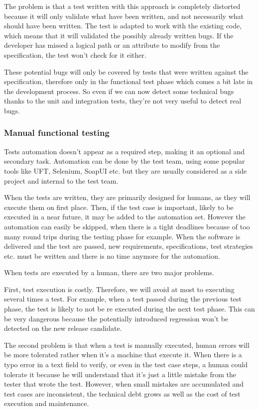 The problem is that a test written with this approach is completely distorted
because it will only validate what have been written, and not necessarily
what should have been written.
The test is adapted to work with the existing code, which means that it will
validated the possibly already written bugs.
If the developer has missed a logical path or an attribute to modify from the
specification, the test won't check for it either.

These potential bugs will only be covered by tests that were written against the
specification, therefore only in the functional test phase which comes a bit
late in the development process.
So even if we can now detect some technical bugs thanks to the unit and
integration tests, they're not very useful to detect real bugs.

\subsubsection{Manual functional testing}
Tests automation doesn't appear as a required step, making it an
optional and secondary task.
Automation can be done by the test team, using some popular tools like UFT,
Selenium, SoapUI etc.
but they are usually considered as a side project and internal to the test team.

When the tests are written, they are primarily designed for humans, as they
will execute them on first place.
Then, if the test case is important, likely to be executed in a near future,
it may be added to the automation set.
However the automation can easily be skipped, when there is a tight
deadlines because of too many round trips during the testing phase for example.
When the software is delivered and the test are passed, new
requirements, specifications, test strategies etc.
must be written and there is no time anymore for the automation.

When tests are executed by a human, there are two major problems.

First, test execution is costly.
Therefore, we will avoid at most to executing several times a test.
For example, when a test passed during the previous test phase, the test
is likely to not be re executed during the next test phase.
This can be very dangerous because the potentially introduced regression
won't be detected on the new release candidate.

The second problem is that when a test is manually executed, human errors
will be more tolerated rather when it's a machine that execute it.
When there is a typo error in a text field to verify, or even in the test case
steps, a human could tolerate it because he will understand that it's just a
little mistake from the tester that wrote the test.
However, when small mistakes are accumulated and test cases are inconsistent,
the technical debt grows as well as the cost of test execution and maintenance.


